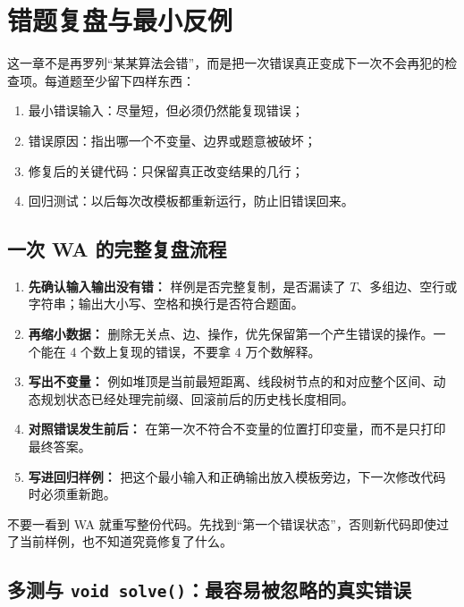 \documentclass[UTF8,openany,oneside,zihao=-4]{ctexbook}
\begin{document}
\chapter{错题复盘与最小反例}

这一章不是再罗列“某某算法会错”，而是把一次错误真正变成下一次不会再犯的检查项。每道题至少留下四样东西：

\begin{enumerate}
  \item 最小错误输入：尽量短，但必须仍然能复现错误；
  \item 错误原因：指出哪一个不变量、边界或题意被破坏；
  \item 修复后的关键代码：只保留真正改变结果的几行；
  \item 回归测试：以后每次改模板都重新运行，防止旧错误回来。
\end{enumerate}

\section{一次 WA 的完整复盘流程}

\begin{enumerate}
  \item \textbf{先确认输入输出没有错：} 样例是否完整复制，是否漏读了 $T$、多组边、空行或字符串；输出大小写、空格和换行是否符合题面。
  \item \textbf{再缩小数据：} 删除无关点、边、操作，优先保留第一个产生错误的操作。一个能在 4 个数上复现的错误，不要拿 4 万个数解释。
  \item \textbf{写出不变量：} 例如堆顶是当前最短距离、线段树节点的和对应整个区间、动态规划状态已经处理完前缀、回滚前后的历史栈长度相同。
  \item \textbf{对照错误发生前后：} 在第一次不符合不变量的位置打印变量，而不是只打印最终答案。
  \item \textbf{写进回归样例：} 把这个最小输入和正确输出放入模板旁边，下一次修改代码时必须重新跑。
\end{enumerate}

\begin{warn}
不要一看到 WA 就重写整份代码。先找到“第一个错误状态”，否则新代码即使过了当前样例，也不知道究竟修复了什么。
\end{warn}

\section{多测与 \texttt{void solve()}：最容易被忽略的真实错误}
\end{document}
